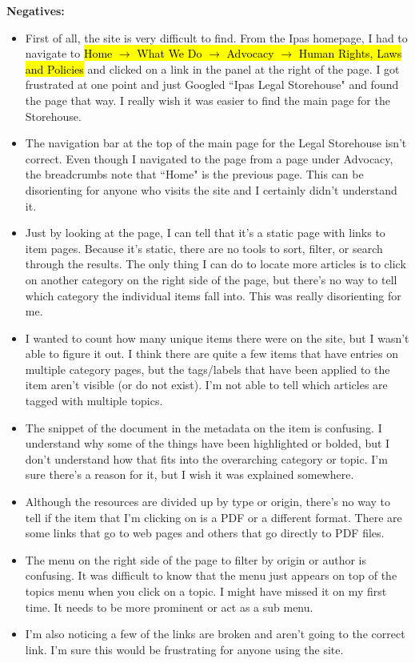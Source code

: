 \documentclass{article}
\DeclareRobustCommand{\hlcyan}[1]{{\sethlcolor{cyan}\hl{#1}}} %
\DeclareRobustCommand{\hlbrown}[1]{{\sethlcolor{brown}\hl{#1}}} %
\begin{document}
    \noindent\textbf{Negatives:}
    \begin{itemize}
    \itemsep0em 
        \item First of all, the site is very difficult to find. From the Ipas homepage, I had to navigate to \hlbrown{Home $\rightarrow$ What We Do $\rightarrow$ Advocacy $\rightarrow$ Human Rights, Laws and Policies} and clicked on a link in the panel at the right of the page. I got frustrated at one point and just Googled ``Ipas Legal Storehouse" and found the page that way. I really wish it was easier to find the main page for the Storehouse.
        \item The navigation bar at the top of the main page for the Legal Storehouse isn't correct. Even though I navigated to the page from a page under Advocacy, the breadcrumbs note that ``Home" is the previous page. This can be disorienting for anyone who visits the site and I certainly didn't understand it.
        \item Just by looking at the page, I can tell that it's a static page with links to item pages. Because it's static, there are no tools to sort, filter, or search through the results. The only thing I can do to locate more articles is to click on another category on the right side of the page, but there's no way to tell which category the individual items fall into. This was really disorienting for me. 
        \item I wanted to count how many unique items there were on the site, but I wasn't able to figure it out. I think there are quite a few items that have entries on multiple category pages, but the tags/labels that have been applied to the item aren't visible (or do not exist). I'm not able to tell which articles are tagged with multiple topics.
        \item The snippet of the document in the metadata on the item is confusing. I understand why some of the things have been highlighted or bolded, but I don't understand how that fits into the overarching category or topic. I'm sure there's a reason for it, but I wish it was explained somewhere.
        \item Although the resources are divided up by type or origin, there's no way to tell if the item that I'm clicking on is a PDF or a different format. There are some links that go to web pages and others that go directly to PDF files. 
        \item The menu on the right side of the page to filter by origin or author is confusing. It was difficult to know that the menu just appears on top of the topics menu when you click on a topic. I might have missed it on my first time. It needs to be more prominent or act as a sub menu. 
        \item I'm also noticing a few of the links are broken and aren't going to the correct link. I'm sure this would be frustrating for anyone using the site.
    \end{itemize} 
    
\end{document}
